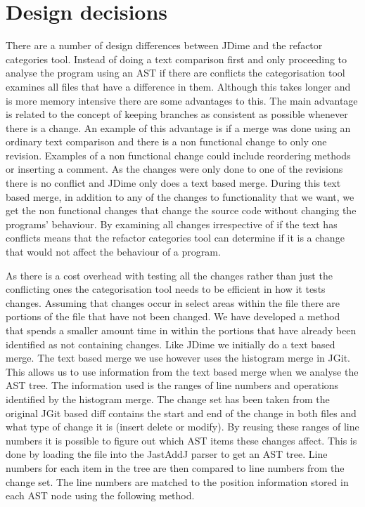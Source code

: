 \section{Design decisions}

% 

There are a number of design differences between JDime and the refactor categories tool.  Instead of doing a text comparison first and only proceeding to analyse the program using an AST if there are conflicts the categorisation tool examines all files that have a difference in them.  Although this takes longer and is more memory intensive there are some advantages to this. The main advantage is related to the concept of keeping branches as consistent as possible whenever there is a change. An example of this advantage is if a merge was done using an ordinary text comparison and there is a non functional change to only one revision. Examples of a non functional change could include reordering methods or inserting a comment.  As the changes were only done to one of the revisions there is no conflict and JDime only does a text based merge.  During this text based merge, in addition to any of the changes to functionality that we want, we get the non functional changes that change the source code without changing the programs' behaviour. By examining all changes irrespective of if the text has conflicts means that the refactor categories tool can determine if it is a change that would not affect the behaviour of a program.

As there is a cost overhead with testing all the changes rather than just the conflicting ones the categorisation tool needs to be efficient in how it tests changes.  Assuming that changes occur in select areas within the file there are portions of the file that have not been changed.  We have developed a method that spends a smaller amount time in  within the portions that have already been identified as not containing changes.  Like JDime we initially do a text based merge.  The text based merge we use however uses the histogram merge in JGit.  This allows us to use information from the text based merge when we analyse the AST tree.  The information used is the ranges of line numbers and operations identified by the histogram merge. The change set has been taken from the original JGit based diff contains the start and end of the change in both files and what type of change it is (insert delete or modify).  By reusing these ranges of line numbers it is possible to figure out which AST items these changes affect. This is done by loading the file into the JastAddJ parser to get an AST tree. Line numbers for each item in the tree are then compared to line numbers from the change set. The line numbers are matched to the position information stored in each AST node using the following method.

